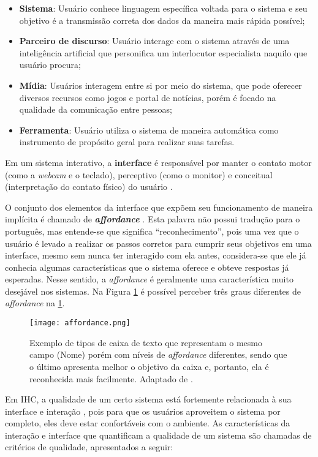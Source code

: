 \begin{itemize}
\item[1] \textbf{Sistema}: Usuário conhece linguagem específica voltada para o sistema e seu objetivo é a transmissão correta dos dados da maneira mais rápida possível;
\item[2] \textbf{Parceiro de discurso}: Usuário interage com o sistema através de uma inteligência artificial que personifica um interlocutor especialista naquilo que usuário procura;
\item[3] \textbf{Mídia}: Usuários interagem entre si por meio do sistema, que pode oferecer diversos recursos como jogos e portal de notícias, porém é focado na qualidade da comunicação entre pessoas;
\item[4] \textbf{Ferramenta}: Usuário utiliza o sistema de maneira automática como instrumento de propósito geral para realizar suas tarefas. 
\end{itemize}

\indent Em um sistema interativo, a \textbf{interface} é responsável por manter o contato motor (como a \textit{webcam} e o teclado), perceptivo (como o monitor) e conceitual (interpretação do contato físico) do usuário \cite{IHCbook}. 

\indent O conjunto dos elementos da interface que expõem seu funcionamento de maneira implícita é chamado de \textbf{\textit{affordance}} \cite{IHCbook}. Esta palavra não possui tradução para o português, mas entende-se que significa ``reconhecimento'', pois uma vez que o usuário é levado a realizar os passos corretos para cumprir seus objetivos em uma interface, mesmo sem nunca ter interagido com ela antes, considera-se que ele já conhecia algumas características que o sistema oferece e obteve respostas já esperadas. Nesse sentido, a \textit{affordance} é geralmente uma característica muito desejável nos sistemas. Na Figura \ref{fig:Affordance} é possível perceber três graus diferentes de \textit{affordance} na \ref{fig:Affordance}.

\begin{figure}[!h]
    \centering
    \texttt{[image: affordance.png]}
    \caption{Exemplo de tipos de caixa de texto que representam o mesmo campo (Nome) porém com níveis de \textit{affordance} diferentes, sendo que o último apresenta melhor o objetivo da caixa e, portanto, ela é reconhecida mais facilmente. Adaptado de \cite{affordance}.}
    \label{fig:Affordance}
\end{figure} 

\indent Em IHC, a qualidade de um certo sistema está fortemente relacionada à sua interface e interação \cite{IHCbook}, pois para que os usuários aproveitem o sistema por completo, eles deve estar confortáveis com o ambiente. As características da interação e interface que quantificam a qualidade de um sistema são chamadas de critérios de qualidade, apresentados a seguir:


